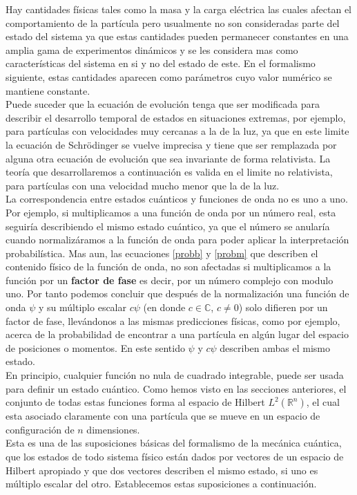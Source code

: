 \documentclass[12pt]{book}
\numberwithin{equation}{chapter}
\def\R{\mathbb{R}}
\def\C{\mathbb{C}}
\begin{document}
Hay cantidades f\'isicas tales como la masa y la carga el\'ectrica las cuales afectan el comportamiento de la part\'icula pero usualmente no son consideradas parte del estado del sistema ya que estas cantidades pueden permanecer constantes en una amplia gama de experimentos din\'amicos y se les considera mas como caracter\'isticas del sistema en si y no del estado de este. En el formalismo siguiente, estas cantidades aparecen como par\'ametros cuyo valor num\'erico se mantiene constante.\\
Puede suceder que la ecuaci\'on de evoluci\'on tenga que ser modificada para describir el desarrollo temporal de estados en situaciones extremas, por ejemplo, para part\'iculas con velocidades muy cercanas a la de la luz, ya que en este limite la ecuaci\'on de Schr\"odinger se vuelve imprecisa y tiene que ser remplazada por alguna otra ecuaci\'on de evoluci\'on que sea invariante de forma relativista. La teor\'ia que desarrollaremos a continuaci\'on es valida en el limite no relativista, para part\'iculas con una velocidad mucho menor que la de la luz.\\

La correspondencia entre estados cu\'anticos y funciones de onda no es uno a uno. Por ejemplo, si multiplicamos a una funci\'on de onda por un n\'umero real, esta seguir\'ia describiendo el mismo estado cu\'antico, ya que el n\'umero se anular\'ia cuando normaliz\'aramos a la funci\'on de onda para poder aplicar la interpretaci\'on probabil\'istica. Mas aun, las ecuaciones \eqref{probb} y \eqref{probm} que describen el contenido f\'isico de la funci\'on de onda, no son afectadas si multiplicamos a la funci\'on por un {\bf factor de fase} es decir, por un n\'umero complejo con modulo uno. Por tanto podemos concluir que despu\'es de la normalizaci\'on una funci\'on de onda $\psi$ y su m\'ultiplo escalar $c \psi$ (en donde $c \in \C$, $ c \neq 0 $) solo difieren por un factor de fase, llev\'andonos a las mismas predicciones f\'isicas, como por ejemplo, acerca de la probabilidad de encontrar a una part\'icula en alg\'un lugar del espacio de posiciones o momentos. En este sentido $\psi$ y $c \psi$ describen ambas el mismo estado.\\

En principio, cualquier funci\'on no nula de cuadrado integrable, puede ser usada para definir un estado cu\'antico. Como hemos visto en las secciones anteriores, el conjunto de todas estas funciones forma al espacio de Hilbert $L^{2}(\R^{n})$, el cual esta asociado claramente con una part\'icula que se mueve en un espacio de configuraci\'on de $n$ dimensiones. \\
Esta es una de las suposiciones b\'asicas del formalismo de la mec\'anica cu\'antica, que los estados de todo sistema f\'isico est\'an dados por vectores de un espacio de Hilbert apropiado y que dos vectores describen el mismo estado, si uno es m\'ultiplo escalar del otro. Establecemos estas suposiciones a continuaci\'on.\\
\end{document}
